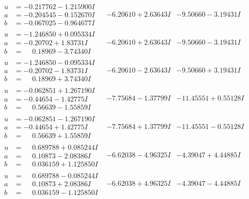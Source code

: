 \documentclass[1p]{elsarticle_modified}
\theoremstyle{definition}
\begin{document}
$$\begin{array}{c|c|c}
\begin{aligned}
u &= -0.217762 - 1.215900 I \\
a &= -0.204545 - 0.152670 I \\
b &= -0.067025 - 0.964677 I\end{aligned}
 & -6.20610 + 2.63643 I & -9.50660 - 3.19431 I \\ \hline\begin{aligned}
u &= -1.246850 + 0.095334 I \\
a &= -0.20702 + 1.83731 I \\
b &= \phantom{-}0.18969 - 3.74340 I\end{aligned}
 & -6.20610 + 2.63643 I & -9.50660 - 3.19431 I \\ \hline\begin{aligned}
u &= -1.246850 - 0.095334 I \\
a &= -0.20702 - 1.83731 I \\
b &= \phantom{-}0.18969 + 3.74340 I\end{aligned}
 & -6.20610 - 2.63643 I & -9.50660 + 3.19431 I \\ \hline\begin{aligned}
u &= -0.062851 + 1.267190 I \\
a &= -0.44654 - 1.42775 I \\
b &= \phantom{-}0.56639 - 1.55859 I\end{aligned}
 & -7.75684 - 1.37799 I & -11.45551 + 0.55128 I \\ \hline\begin{aligned}
u &= -0.062851 - 1.267190 I \\
a &= -0.44654 + 1.42775 I \\
b &= \phantom{-}0.56639 + 1.55859 I\end{aligned}
 & -7.75684 + 1.37799 I & -11.45551 - 0.55128 I \\ \hline\begin{aligned}
u &= \phantom{-}0.689788 + 0.085244 I \\
a &= \phantom{-}0.10873 - 2.08386 I \\
b &= \phantom{-}0.036159 + 1.125850 I\end{aligned}
 & -6.62038 - 4.96325 I & -4.39047 + 4.44885 I \\ \hline\begin{aligned}
u &= \phantom{-}0.689788 - 0.085244 I \\
a &= \phantom{-}0.10873 + 2.08386 I \\
b &= \phantom{-}0.036159 - 1.125850 I\end{aligned}
 & -6.62038 + 4.96325 I & -4.39047 - 4.44885 I \\ \hline\begin{aligned}

\end{aligned}
\end{array}$$
\end{document}
